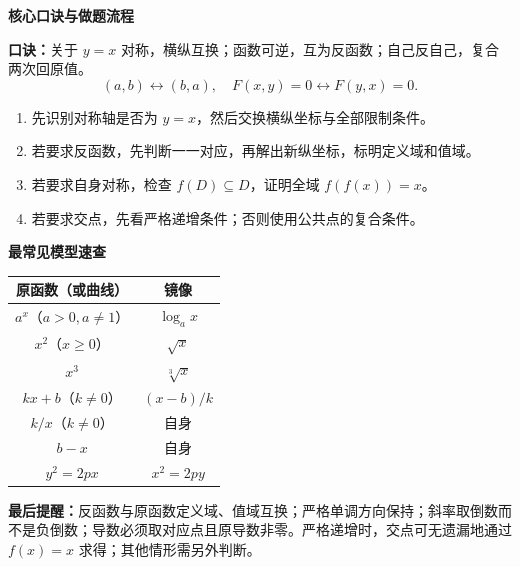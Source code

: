 \clearpage
\begin{summarybox}
\textbf{\textcolor{CSummary}{核心口诀与做题流程}}


\textbf{口诀：}关于 $y=x$ 对称，横纵互换；函数可逆，互为反函数；自己反自己，复合两次回原值。
\[
 (a,b)\leftrightarrow(b,a),\quad F(x,y)=0\leftrightarrow F(y,x)=0.
\]
\begin{enumerate}[leftmargin=*,itemsep=.4em]
\item 先识别对称轴是否为 $y=x$，然后交换横纵坐标与全部限制条件。
\item 若要求反函数，先判断一一对应，再解出新纵坐标，标明定义域和值域。
\item 若要求自身对称，检查 $f(D)\subseteq D$，证明全域 $f(f(x))=x$。
\item 若要求交点，先看严格递增条件；否则使用公共点的复合条件。
\end{enumerate}
\end{summarybox}
\clearpage
\begin{summarybox}
\textbf{\textcolor{CSummary}{最常见模型速查}}


\begin{center}\renewcommand{\arraystretch}{1.4}
\begin{tabular}{c|c}
原函数（或曲线） & 镜像\\\hline
$a^x$（$a>0,a\ne1$） & $\log_a x$\\
$x^2$（$x\ge0$） & $\sqrt{x}$\\
$x^3$ & $\sqrt[3]{x}$\\
$kx+b$（$k\ne0$） & $(x-b)/k$\\
$k/x$（$k\ne0$） & 自身\\
$b-x$ & 自身\\
$y^2=2px$ & $x^2=2py$
\end{tabular}\end{center}
\textbf{最后提醒：}反函数与原函数定义域、值域互换；严格单调方向保持；斜率取倒数而不是负倒数；导数必须取对应点且原导数非零。严格递增时，交点可无遗漏地通过 $f(x)=x$ 求得；其他情形需另外判断。
\end{summarybox}
